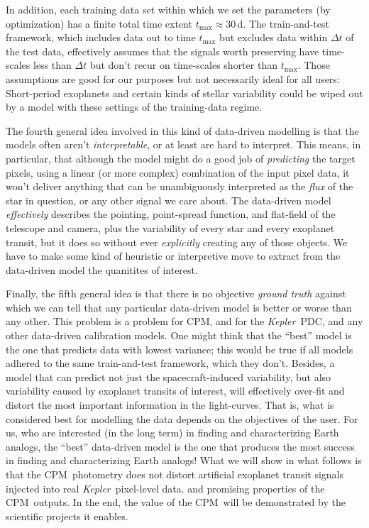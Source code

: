 \documentclass[12pt, preprint]{aastex}
\newcommand{\project}[1]{\textsl{#1}}
\newcommand{\Kepler}{\project{Kepler}}
\newcommand{\name}{CPM}
\begin{document}
In addition, 
  each training data set within which we set the parameters (by optimization) has a finite total time extent $t_{\max}\approx 30$\,d.
The train-and-test framework, which includes data out to time $t_{\max}$ but excludes data within $\Delta t$ of the test data,
  effectively assumes that the signals worth preserving have time-scales less than $\Delta t$ 
  but don't recur on time-scales shorter than $t_{\max}$.
Those assumptions are good for our purposes but not necessarily ideal for all users:
Short-period exoplanets and certain kinds of stellar variability
  could be wiped out by a model with these settings of the training-data regime.

The fourth general idea involved in this kind of data-driven modelling is that the models often aren't \emph{interpretable}, 
  or at least are hard to interpret.
This means, in particular, that although the model might do a good job of \emph{predicting} the target pixels,
  using a linear (or more complex) combination of the input pixel data,
  it won't deliver anything that can be unambiguously interpreted as the \emph{flux} of the star in question,
  or any other signal we care about.
The data-driven model \emph{effectively} describes the pointing, point-spread function, and flat-field
  of the telescope and camera,
  plus the variability of every star and every exoplanet transit,
  but it does so without ever \emph{explicitly} creating any of those objects.
We have to make some kind of heuristic or interpretive move to extract from the data-driven model the quanitites of interest.

Finally, the fifth general idea is that there is no objective \emph{ground truth} against which we can tell
  that any particular data-driven model is better or worse than any other.
This problem is a problem for \name, and for the \Kepler\ PDC, and any other data-driven calibration models.
One might think that the ``best'' model is the one that predicts data with lowest variance;
  this would be true if all models adhered to the same train-and-test framework, which they don't.
Besides, a model that can predict not just the spacecraft-induced variability,
  but also variability caused by exoplanet transits of interest,
  will effectively over-fit and distort the most important information in the light-curves.
That is, what is considered best for modelling the data depends on the objectives of the user.
For us, who are interested (in the long term) in finding and characterizing Earth analogs,
  the ``best'' data-driven model is the one that produces the most success in finding and characterizing Earth analogs!
What we will show in what follows is that the \name\ photometry does not distort
  artificial exoplanet transit signals injected into real \Kepler\ pixel-level data.
  and promising properties of the \name\ outputs.
In the end, the value of the \name\ will be demonstrated by the scientific projects it enables.
\end{document}
